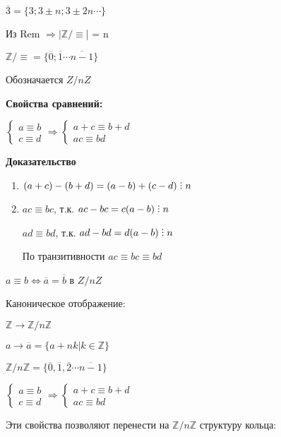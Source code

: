 \documentclass[14pt, letter paper]{article}
\def\divby{%
  \mathrel{\text{\vbox{\baselineskip.65ex\lineskiplimit0pt\hbox{.}\hbox{.}\hbox{.}}}}%
}
\begin{document}
$\overline{3} = \{ 3; 3 \pm n; 3 \pm 2n \cdots \}$

Из Rem $\Rightarrow |\mathds{Z}/\equiv$| = n

$\mathds{Z}/\equiv = \{ \overline{0}; \overline{1} \cdots \overline{n - 1} \}$

Обозначается $Z/nZ$

\textbf{Свойства сравнений:}

$\begin{cases}
    a \equiv b \\
    c \equiv d
\end{cases} \Rightarrow \begin{cases}
    a + c \equiv b + d \\
    ac \equiv bd
\end{cases}$

\begin{center}
    \textbf{Доказательство}
\end{center}

\begin{enumerate}
    \item $(a + c) - (b + d) = (a - b) + (c - d) \divby n$
    \item $ac \equiv bc$, т.к. $ac - bc = c(a - b) \divby n$

    $ad \equiv bd$, т.к. $ad - bd = d(a-b) \divby n$

    По транзитивности $ac \equiv bc \equiv bd$
\end{enumerate}

$a \equiv b \Leftrightarrow \overline{a} = \overline{b}$ в $Z/nZ$

Каноническое отображение:

$\mathds{Z} \rightarrow \mathds{Z}/n\mathds{Z}$

$a \rightarrow \overline{a} = \{ a + nk | k \in \mathds{Z}\}$

$\mathds{Z}/n\mathds{Z} = \{ \overline{0}, \overline{1}, \overline{2} \cdots \overline{n-1} \}$

$\begin{cases}
    a \equiv b \\
    c \equiv d
\end{cases} \Rightarrow \begin{cases}
    a + c \equiv b + d \\
    ac \equiv bd
\end{cases}$

Эти свойства позволяют перенести на $\mathds{Z}/n\mathds{Z}$ структуру кольца:
\end{document}
